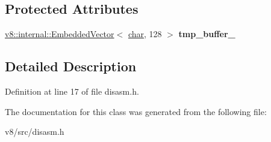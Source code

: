 \subsection*{Protected Attributes}
\begin{DoxyCompactItemize}
\item 
\mbox{\label{classdisasm_1_1NameConverter_a5badefd2fdf514300cea532e79721915}} 
\mbox{\hyperlink{classv8_1_1internal_1_1EmbeddedVector}{v8\+::internal\+::\+Embedded\+Vector}}$<$ \mbox{\hyperlink{classchar}{char}}, 128 $>$ {\bfseries tmp\+\_\+buffer\+\_\+}
\end{DoxyCompactItemize}


\subsection{Detailed Description}


Definition at line 17 of file disasm.\+h.



The documentation for this class was generated from the following file\+:\begin{DoxyCompactItemize}
\item 
v8/src/disasm.\+h\end{DoxyCompactItemize}
